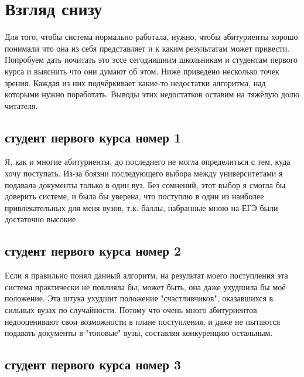 \documentclass[pdftex, 12pt, a4paper]{article}
\begin{document}
\section{Взгляд снизу} 

Для того, чтобы система нормально работала, нужно, чтобы абитуриенты хорошо понимали что она из себя представляет и к каким результатам может привести. Попробуем дать почитать это эссе сегодняшним школьникам и студентам первого курса и выяснить что они думают об этом. Ниже приведёно несколько точек зрения. Каждая из них подчёркивает какие-то недостатки алгоритма, над которыми нужно поработать. Выводы этих недостатков оставим на тяжёлую долю читателя.


\subsection{студент первого курса номер 1}

Я, как и многие абитуриенты, до последнего не могла определиться с тем, куда хочу поступать. Из-за боязни последующего выбора между университетами я подавала документы только в один вуз. Без сомнений, этот выбор я смогла бы доверить системе, и была бы уверена, что поступлю в один из наиболее привлекательных для меня вузов, т.к. баллы, набранные мною на ЕГЭ были достаточно высокие.

\subsection{студент первого курса номер 2}

Если я правильно понял данный алгоритм, на результат моего поступления эта система практически не повлияла бы, может быть, она даже ухудшила бы моё положение. Эта штука ухудшит положение "счастливчиков", оказавшихся в сильных вузах по случайности. Потому что очень много абитуриентов недооценивают свои возможности в плане поступления, и даже не пытаются подавать документы в "топовые" вузы, составляя конкуренцию остальным.

\subsection{студент первого курса номер 3}
\end{document}
